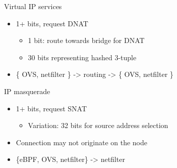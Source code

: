 \documentclass[black,white,aspectratio=169]{beamer}
\DeclareRobustCommand{\#}{\adjustbox{valign=B,totalheight=.57\baselineskip}{\oldhash}}%
\begin{document}
    \begin{frame}{Virtual IP services}
        \begin{itemize}
            \item 1+ bits, request DNAT~\smallskip
            \begin{itemize}
                \item 1 bit: route towards bridge for DNAT~\smallskip
                \item 30 bits representing hashed 3-tuple~\medskip
            \end{itemize}
            \item  \{ OVS, netfilter \} -> routing -> \{ OVS, netfilter \}~\medskip
        \end{itemize}
    \end{frame}

    \begin{frame}{IP masquerade}
        \begin{itemize}
            \item 1+ bits, request SNAT~\smallskip
            \begin{itemize}
                \item Variation: 32 bits for source address selection~\medskip
            \end{itemize}
            \item Connection may not originate on the node~\medskip
            \item \{eBPF, OVS, netfilter\} -> netfilter~\medskip
        \end{itemize}
    \end{frame}
\end{document}
